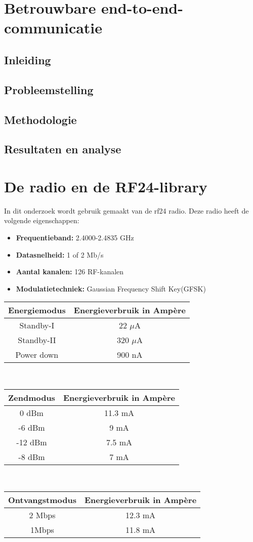 \documentclass{article}
\begin{document}
\newpage

\clearpage
\section{Betrouwbare end-to-end-communicatie}
\subsection{Inleiding}
\subsection{Probleemstelling}
\subsection{Methodologie}
\subsection{Resultaten en analyse}
\clearpage
\appendix
\section{De radio en de RF24-library}
In dit onderzoek wordt gebruik gemaakt van de rf24 radio. Deze radio heeft de volgende eigenschappen:
	\begin{itemize}	
	\item\textbf{Frequentieband: }2.4000-2.4835 GHz
	\item\textbf{Datasnelheid: }1 of 2 Mb/s
	\item\textbf{Aantal kanalen: }126 RF-kanalen
	\item\textbf{Modulatietechniek: }Gaussian Frequency Shift Key(GFSK)
	\end{itemize}
\begin{tabular}{c||c}
\textbf{Energiemodus}  & \textbf{Energieverbruik in Amp\`ere}     \\
\hline
Standby-I   & 22 $\mu$A    \\
Standby-II  & 320 $\mu$A     \\
Power down  & 900 nA 
\end{tabular}\\
\begin{tabular}{c||c}
\textbf{Zendmodus}  & \textbf{Energieverbruik in Amp\`ere}     \\
\hline
0 dBm  & 11.3 mA    \\
-6 dBm & 9 mA     \\
-12 dBm & 7.5 mA  \\
-8 dBm & 7 mA
\end{tabular}\\
\begin{tabular}{c||c}
\textbf{Ontvangstmodus}  & \textbf{Energieverbruik in Amp\`ere}     \\
\hline
2 Mbps   & 12.3 mA    \\
1Mbps & 11.8 mA     
\end{tabular}
\end{document}
